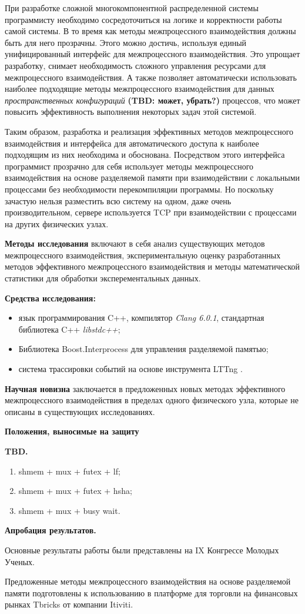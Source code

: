 При разработке сложной многокомпонентной распределенной системы программисту необходимо сосредоточиться на логике и корректности работы самой системы. В то время как методы межпроцессного взаимодействия должны быть для него прозрачны. Этого можно достичь, используя единый унифицированный интерфейс для межпроцессного взаимодействия. Это упрощает разработку, снимает необходимость сложного управления ресурсами для межпроцессного взаимодействия. А также позволяет автоматически использовать наиболее подходящие методы межпроцессного взаимодействия для данных \textit{пространственных конфигураций} \textbf{(TBD: может, убрать?)} процессов, что может повысить эффективность выполнения некоторых задач этой системой.

Таким образом, разработка и реализация эффективных методов межпроцессного взаимодействия и интерфейса для автоматического доступа к наиболее подходящим из них необходима и обоснована. Посредством этого интерфейса программист прозрачно для себя использует методы межпроцессного взаимодействия на основе разделяемой памяти при взаимодействии с локальными процессами без необходимости перекомпиляции программы. Но поскольку зачастую нельзя разместить всю систему на одном, даже очень производительном, сервере используется TCP при взаимодействии с процессами на других физических узлах.

\textbf{Методы исследования} включают в себя анализ существующих методов межпроцессного взаимодействия, экспериментальную оценку разработанных методов эффективного межпроцессного взаимодействия и методы математической статистики для обработки эксперементальных данных.

\textbf{Средства исследования:}
\begin{itemize}
\item язык программирования C++, компилятор \textit{Clang 6.0.1}, стандартная библиотека C++ \textit{libstdc++};
\item Библиотека Boost.Interprocess \cite{BoostInterprocess} для управления разделяемой памятью;
\item система трассировки событий \cite{LTTngThesis} на основе инструмента LTTng \cite{LTTngSite}.
\end{itemize}

\textbf{Научная новизна} заключается в предложенных новых методах эффективного межпроцессного взаимодействия в пределах одного физического узла, которые не описаны в существующих исследованиях.

\textbf{Положения, выносимые на защиту}

\textbf{TBD.}
\begin{enumerate}
\item shmem + mux + futex + lf;
\item shmem + mux + futex + hsha;
\item shmem + mux + busy wait.
\end{enumerate}


\textbf{Апробация результатов.}

Основные результаты работы были представлены на IX Конгрессе Молодых Ученых.

Предложенные методы межпроцессного взаимодействия на основе разделяемой памяти подготовлены к использованию в платформе для торговли на финансовых рынках Tbricks от компании Itiviti.
